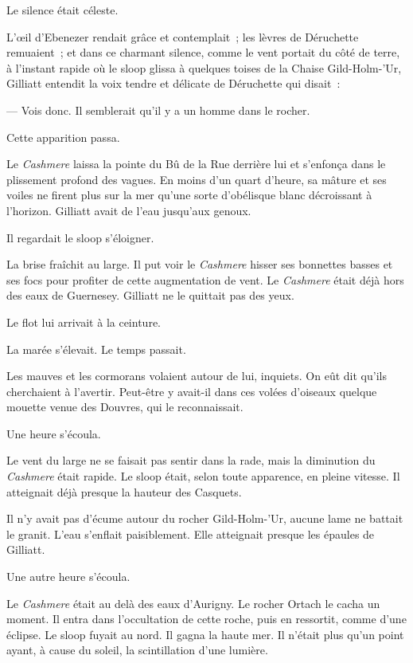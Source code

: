 \documentclass[french,twoside]{book} %
\begin{document}
Le silence était céleste.\par
L’œil d’Ebenezer rendait grâce et contemplait ; les lèvres de Déruchette remuaient ; et dans ce charmant silence, comme le vent portait du côté de terre, à l’instant rapide où le sloop glissa à quelques toises de la Chaise Gild-Holm-’Ur, Gilliatt entendit la voix tendre et délicate de Déruchette qui disait :\par
— Vois donc. Il semblerait qu’il y a un homme dans le rocher.\par
 Cette apparition passa.\par
Le \emph{Cashmere} laissa la pointe du Bû de la Rue derrière lui et s’enfonça dans le plissement profond des vagues. En moins d’un quart d’heure, sa mâture et ses voiles ne firent plus sur la mer qu’une sorte d’obélisque blanc décroissant à l’horizon. Gilliatt avait de l’eau jusqu’aux genoux.\par
Il regardait le sloop s’éloigner.\par
La brise fraîchit au large. Il put voir le \emph{Cashmere} hisser ses bonnettes basses et ses focs pour profiter de cette augmentation de vent. Le \emph{Cashmere} était déjà hors des eaux de Guernesey. Gilliatt ne le quittait pas des yeux.\par
Le flot lui arrivait à la ceinture.\par
La marée s’élevait. Le temps passait.\par
Les mauves et les cormorans volaient autour de lui, inquiets. On eût dit qu’ils cherchaient à l’avertir. Peut-être y avait-il dans ces volées d’oiseaux quelque mouette venue des Douvres, qui le reconnaissait.\par
Une heure s’écoula.\par
Le vent du large ne se faisait pas sentir dans la rade, mais la diminution du \emph{Cashmere} était rapide. Le sloop était, selon toute apparence, en pleine vitesse. Il atteignait déjà presque la hauteur des Casquets.\par
Il n’y avait pas d’écume autour du rocher Gild-Holm-’Ur, aucune lame ne battait le granit. L’eau s’enflait paisiblement. Elle atteignait presque les épaules de Gilliatt.\par
Une autre heure s’écoula.\par
Le \emph{Cashmere} était au delà des eaux d’Aurigny. Le  rocher Ortach le cacha un moment. Il entra dans l’occultation de cette roche, puis en ressortit, comme d’une éclipse. Le sloop fuyait au nord. Il gagna la haute mer. Il n’était plus qu’un point ayant, à cause du soleil, la scintillation d’une lumière.\par
\end{document}
